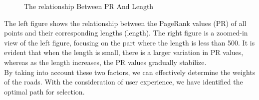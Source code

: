 \begin{figure}[H]%
    \centering
    \caption{The relationship Between PR And Length}
\end{figure}
\indent The left figure shows the relationship between the PageRank values (PR) of all points and their corresponding lengths (length). The right figure is a zoomed-in view of the left figure, focusing on the part where the length is less than 500. It is evident that when the length is small, there is a larger variation in PR values, whereas as the length increases, the PR values gradually stabilize.\\
\indent By taking into account these two factors, we can effectively determine the weights of the roads. With the consideration of user experience, we have identified the optimal path for selection.





